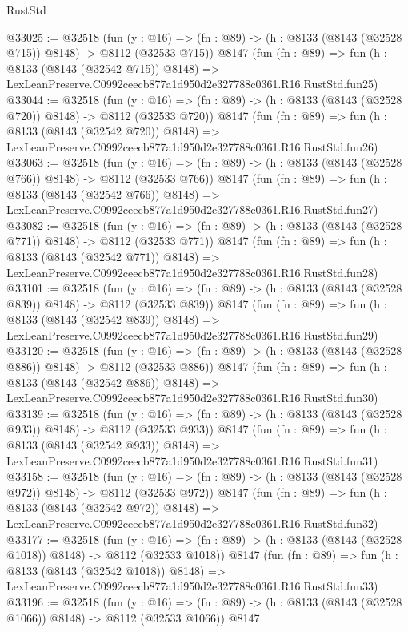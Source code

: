 \begin{lexlean}{RustStd}
\begin{coremodule}
@33025 := @32518
    (fun (y : @16) => (fn : @89) -> (h : @8133 (@8143 (@32528 @715)) @8148) -> @8112 (@32533 @715))
    @8147
    (fun (fn : @89) =>
    fun (h : @8133 (@8143 (@32542 @715)) @8148) =>
    LexLeanPreserve.C0992ceecb877a1d950d2e327788c0361.R16.RustStd.fun25)
@33044 := @32518
    (fun (y : @16) => (fn : @89) -> (h : @8133 (@8143 (@32528 @720)) @8148) -> @8112 (@32533 @720))
    @8147
    (fun (fn : @89) =>
    fun (h : @8133 (@8143 (@32542 @720)) @8148) =>
    LexLeanPreserve.C0992ceecb877a1d950d2e327788c0361.R16.RustStd.fun26)
@33063 := @32518
    (fun (y : @16) => (fn : @89) -> (h : @8133 (@8143 (@32528 @766)) @8148) -> @8112 (@32533 @766))
    @8147
    (fun (fn : @89) =>
    fun (h : @8133 (@8143 (@32542 @766)) @8148) =>
    LexLeanPreserve.C0992ceecb877a1d950d2e327788c0361.R16.RustStd.fun27)
@33082 := @32518
    (fun (y : @16) => (fn : @89) -> (h : @8133 (@8143 (@32528 @771)) @8148) -> @8112 (@32533 @771))
    @8147
    (fun (fn : @89) =>
    fun (h : @8133 (@8143 (@32542 @771)) @8148) =>
    LexLeanPreserve.C0992ceecb877a1d950d2e327788c0361.R16.RustStd.fun28)
@33101 := @32518
    (fun (y : @16) => (fn : @89) -> (h : @8133 (@8143 (@32528 @839)) @8148) -> @8112 (@32533 @839))
    @8147
    (fun (fn : @89) =>
    fun (h : @8133 (@8143 (@32542 @839)) @8148) =>
    LexLeanPreserve.C0992ceecb877a1d950d2e327788c0361.R16.RustStd.fun29)
@33120 := @32518
    (fun (y : @16) => (fn : @89) -> (h : @8133 (@8143 (@32528 @886)) @8148) -> @8112 (@32533 @886))
    @8147
    (fun (fn : @89) =>
    fun (h : @8133 (@8143 (@32542 @886)) @8148) =>
    LexLeanPreserve.C0992ceecb877a1d950d2e327788c0361.R16.RustStd.fun30)
@33139 := @32518
    (fun (y : @16) => (fn : @89) -> (h : @8133 (@8143 (@32528 @933)) @8148) -> @8112 (@32533 @933))
    @8147
    (fun (fn : @89) =>
    fun (h : @8133 (@8143 (@32542 @933)) @8148) =>
    LexLeanPreserve.C0992ceecb877a1d950d2e327788c0361.R16.RustStd.fun31)
@33158 := @32518
    (fun (y : @16) => (fn : @89) -> (h : @8133 (@8143 (@32528 @972)) @8148) -> @8112 (@32533 @972))
    @8147
    (fun (fn : @89) =>
    fun (h : @8133 (@8143 (@32542 @972)) @8148) =>
    LexLeanPreserve.C0992ceecb877a1d950d2e327788c0361.R16.RustStd.fun32)
@33177 := @32518
    (fun (y : @16) =>
    (fn : @89) -> (h : @8133 (@8143 (@32528 @1018)) @8148) -> @8112 (@32533 @1018))
    @8147
    (fun (fn : @89) =>
    fun (h : @8133 (@8143 (@32542 @1018)) @8148) =>
    LexLeanPreserve.C0992ceecb877a1d950d2e327788c0361.R16.RustStd.fun33)
@33196 := @32518
    (fun (y : @16) =>
    (fn : @89) -> (h : @8133 (@8143 (@32528 @1066)) @8148) -> @8112 (@32533 @1066))
    @8147

\end{coremodule}
\end{lexlean}
